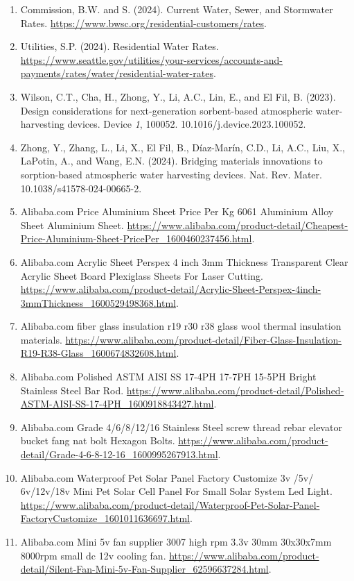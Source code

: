 \documentclass[11pt]{article}
\begin{document}
\begin{enumerate}[leftmargin=2em,itemsep=0.25em]
\item Commission, B.W. and S. (2024). Current Water, Sewer, and Stormwater Rates. \url{https://www.bwsc.org/residential-customers/rates}.
\item Utilities, S.P. (2024). Residential Water Rates. \url{https://www.seattle.gov/utilities/your-services/accounts-and-payments/rates/water/residential-water-rates}.
\item Wilson, C.T., Cha, H., Zhong, Y., Li, A.C., Lin, E., and El Fil, B. (2023). Design considerations for next-generation sorbent-based atmospheric water-harvesting devices. Device \textit{1}, 100052. 10.1016/j.device.2023.100052.
\item Zhong, Y., Zhang, L., Li, X., El Fil, B., Díaz-Marín, C.D., Li, A.C., Liu, X., LaPotin, A., and Wang, E.N. (2024). Bridging materials innovations to sorption-based atmospheric water harvesting devices. Nat. Rev. Mater. 10.1038/s41578-024-00665-2.
\item Alibaba.com Price Aluminium Sheet Price Per Kg 6061 Aluminium Alloy Sheet Aluminium Sheet. \url{https://www.alibaba.com/product-detail/Cheapest-Price-Aluminium-Sheet-PricePer_1600460237456.html}.
\item Alibaba.com Acrylic Sheet Perspex 4 inch 3mm Thickness Transparent Clear Acrylic Sheet Board Plexiglass Sheets For Laser Cutting. \url{https://www.alibaba.com/product-detail/Acrylic-Sheet-Perspex-4inch-3mmThickness_1600529498368.html}.
\item Alibaba.com fiber glass insulation r19 r30 r38 glass wool thermal insulation materials. \url{https://www.alibaba.com/product-detail/Fiber-Glass-Insulation-R19-R38-Glass_1600674832608.html}.
\item Alibaba.com Polished ASTM AISI SS 17-4PH 17-7PH 15-5PH Bright Stainless Steel Bar Rod. \url{https://www.alibaba.com/product-detail/Polished-ASTM-AISI-SS-17-4PH_1600918843427.html}.
\item Alibaba.com Grade 4/6/8/12/16 Stainless Steel screw thread rebar elevator bucket fang nat bolt Hexagon Bolts. \url{https://www.alibaba.com/product-detail/Grade-4-6-8-12-16_1600995267913.html}.
\item Alibaba.com Waterproof Pet Solar Panel Factory Customize 3v /5v/ 6v/12v/18v Mini Pet Solar Cell Panel For Small Solar System Led Light. \url{https://www.alibaba.com/product-detail/Waterproof-Pet-Solar-Panel-FactoryCustomize_1601011636697.html}.
\item Alibaba.com Mini 5v fan supplier 3007 high rpm 3.3v 30mm 30x30x7mm 8000rpm small dc 12v cooling fan. \url{https://www.alibaba.com/product-detail/Silent-Fan-Mini-5v-Fan-Supplier_62596637284.html}.

\end{enumerate}
\end{document}
